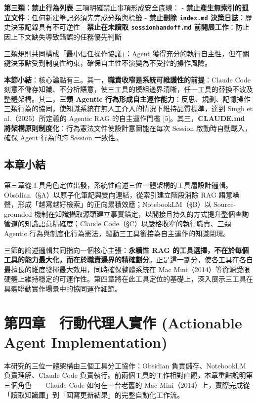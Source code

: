 \textbf{第三類：禁止行為列表} 三項明確禁止事項形成安全底線： -
\textbf{禁止產生無索引的孤立文件}：任何新建筆記必須先完成分類與標籤 -
\textbf{禁止刪除 \texttt{index.md} 決策日誌}：歷史決策記錄具有不可逆性 -
\textbf{禁止在未讀取 \texttt{sessionhandoff.md}
前開展工作}：防止因上下文缺失導致錯誤的任務優先判斷

三類規則共同構成「最小信任操作協議」：Agent
獲得充分的執行自主性，但在關鍵決策點受到制度性約束，確保自主性不演變為不受控的操作風險。

\textbf{本節小結}：核心論點有三。其一，\textbf{職責收窄是系統可維護性的前提}：Claude
Code
刻意不儲存知識、不分析語意，使三工具的模組邊界清晰，任一工具的替換不波及整體架構。其二，\textbf{三類
Agentic
行為形成自主運作能力}：反思、規劃、記憶操作三類行為的協同，使知識系統在無人工介入的情況下維持品質標準，達到
Singh et al.（2025）所定義的 Agentic RAG 的自主運作門檻
{[}5{]}。其三，\textbf{CLAUDE.md
將架構原則制度化}：行為憲法文件使設計意圖能在每次 Session
啟動時自動載入，確保 Agent 行為的跨 Session 一致性。

\section{本章小結}\label{ux672cux7ae0ux5c0fux7d50}

第三章從工具角色定位出發，系統性論述三位一體架構的工具層設計邏輯。Obsidian（§A）以原子化筆記與雙向連結，從索引建立階段消除
RAG 語意噪聲，形成「越寫越好檢索」的正向累積效應；NotebookLM（§B）以
Source-grounded
機制在知識攝取源頭建立事實錨定，以間接且持久的方式提升整個查詢管道的知識語意精確度；Claude
Code（§C）以嚴格收窄的執行職責、三類 Agentic
行為與制度化行為憲法，驅動三工具銜接為自主運作的知識閉環。

三節的論述邏輯共同指向一個核心主張：\textbf{永續性 RAG
的工具選擇，不在於每個工具的能力最大化，而在於職責邊界的精確劃分}。正是這一劃分，使各工具在各自最擅長的維度發揮最大效用，同時確保整體系統在
Mac
Mini（2014）等資源受限硬體上維持穩定的可運作性。第四章將在此工具定位的基礎上，深入展示三工具在具體聯動實作場景中的協同運作細節。

\chapter{第四章　行動代理人實作 (Actionable Agent
Implementation)}\label{ux7b2cux56dbux7ae0-ux884cux52d5ux4ee3ux7406ux4ebaux5be6ux4f5c-actionable-agent-implementation}

本研究的三位一體架構由三個工具分工協作：Obsidian 負責儲存、NotebookLM
負責理解、Claude Code
負責執行。前兩個工具的工作相對直觀，本章重點說明第三個角色------Claude
Code 如何在一台老舊的 Mac
Mini（2014）上，實際完成從「讀取知識庫」到「回寫更新結果」的完整自動化工作流。

